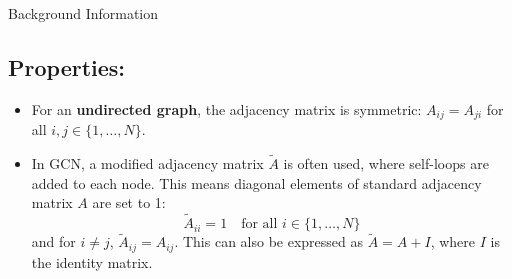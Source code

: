 \documentclass[twocolumn]{article}
\begin{document}
\begin{literaturepaper}{Background Information}
\subsection*{Properties:}

\begin{itemize}
    \item For an \textbf{undirected graph}, the adjacency matrix is symmetric: $A_{ij} = A_{ji}$ for all $i, j \in \{1, \ldots, N\}$.

    \item In GCN, a modified adjacency matrix $\tilde{A}$ is often used, where self-loops are added to each node. This means diagonal elements of standard adjacency matrix $A$ are set to 1:
    $$
    \tilde{A}_{ii} = 1 \quad \text{for all } i \in \{1, \ldots, N\}
    $$
    and for $i \neq j$, $\tilde{A}_{ij} = A_{ij}$. This can also be expressed as $\tilde{A} = A + I$, where $I$ is the identity matrix.
\end{itemize}

\end{literaturepaper} 
\end{document}
